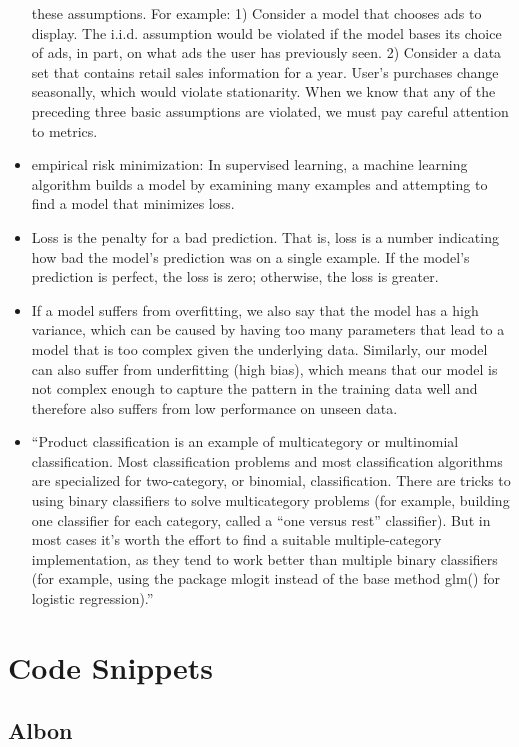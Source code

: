 \documentclass[]{book}
\begin{document}
\begin{itemize}
  these assumptions. For example: 1) Consider a model that chooses ads
  to display. The i.i.d. assumption would be violated if the model bases
  its choice of ads, in part, on what ads the user has previously seen.
  2) Consider a data set that contains retail sales information for a
  year. User's purchases change seasonally, which would violate
  stationarity. When we know that any of the preceding three basic
  assumptions are violated, we must pay careful attention to metrics.
\item
  empirical risk minimization: In supervised learning, a machine
  learning algorithm builds a model by examining many examples and
  attempting to find a model that minimizes loss.
\item
  Loss is the penalty for a bad prediction. That is, loss is a number
  indicating how bad the model's prediction was on a single example. If
  the model's prediction is perfect, the loss is zero; otherwise, the
  loss is greater.
\item
  If a model suffers from overfitting, we also say that the model has a
  high variance, which can be caused by having too many parameters that
  lead to a model that is too complex given the underlying data.
  Similarly, our model can also suffer from underfitting (high bias),
  which means that our model is not complex enough to capture the
  pattern in the training data well and therefore also suffers from low
  performance on unseen data.
\item
  ``Product classification is an example of multicategory or multinomial
  classification. Most classification problems and most classification
  algorithms are specialized for two-category, or binomial,
  classification. There are tricks to using binary classifiers to solve
  multicategory problems (for example, building one classifier for each
  category, called a ``one versus rest'' classifier). But in most cases
  it's worth the effort to find a suitable multiple-category
  implementation, as they tend to work better than multiple binary
  classifiers (for example, using the package mlogit instead of the base
  method glm() for logistic regression).''
\end{itemize}

\chapter{Code Snippets}\label{code-snippets}

\section{Albon}\label{albon}
\end{document}

